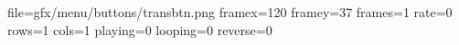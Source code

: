 file=gfx/menu/buttons/transbtn.png
framex=120
framey=37
frames=1
rate=0
rows=1
cols=1
playing=0
looping=0
reverse=0